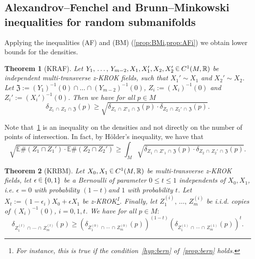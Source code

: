 \documentclass[AHL, Unicode, longabstracts, published]{cedram}
\newtheorem{mainthm}{Theorem}
\newcommand{\R}{\mathbb{R}}
\newcommand{\EE}{\mathbb{E}}
\newcommand{\fkZ}{\mathfrak{Z}}
\newcommand{\zkrok}{\emph{z-KROK}\xspace}
\newcommand*\randin{
\mathchoice {\raisebox{-.35ex}{$\displaystyle{^\subset}$}\mkern-11.5mu\raisebox{+.45ex}{$\displaystyle{_\subset}$}} {\mkern+1mu\raisebox{-.27ex}{$\textstyle{^\subset}$}\mkern-11.7mu\raisebox{+.45ex}{$\textstyle{_\subset}$}} {\raisebox{.35ex}{$\scriptstyle\subset$}\mkern-14mu\raisebox{-.15ex}{$\scriptstyle\subset$}} {\raisebox{.3ex}{$\scriptscriptstyle\subset$}\mkern-13.5mu\raisebox{-.10ex}{$\scriptscriptstyle\subset$}}}
\begin{document}
\subsection{Alexandrov--Fenchel and Brunn--Minkowski inequalities for random submanifolds}\label{sub:AFBM}

Applying the inequalities (AF) and (BM) (\cref{prop:BMi,prop:AFi}) we obtain lower bounds for the densities.

\begin{mainthm}[KRAF]\label{cor:KRAF}
Let $Y_1,\,\ldots,\,Y_{m-2},X_1,X_1',X_2,X_2'\,\randin\, C^1(M,\R)$ be independent multi-transverse {\zkrok} fields, such that $X_1'\sim X_1$ and $X_2'\sim X_2$. Let $\fkZ:=(Y_1)^{-1}(0)\cap\ldots\cap(Y_{m-2})^{-1}(0)$, $Z_i:=(X_i)^{-1}(0)$ and $Z_i':=(X_i')^{-1}(0)$. Then we have for all $p\in M$
\begin{equation*}
\delta_{Z_1\,\cap\,Z_2\,\cap\,\fkZ}(p)\geq \sqrt{\delta_{ Z_1\,\cap\,Z'_1\,\cap\,\fkZ}(p)\cdot \delta_{Z_2\,\cap\,Z_2'\,\cap\,\fkZ}(p)}.
\end{equation*}
\end{mainthm}

\begin{rema}
Note that~\cref{cor:KRAF} is an inequality on the densities and not directly on the number of points of intersection. In fact, by H\"older's inequality, we have that
\begin{equation*}
\sqrt{\EE\#\left(Z_1\cap Z_1'\right)\cdot\EE\#\left(Z_2\cap Z_2'\right)}\geq \int_M \sqrt{\delta_{ Z_1\,\cap\,Z'_1\,\cap\,\fkZ}(p)\cdot \delta_{Z_2\,\cap\,Z_2'\,\cap\,\fkZ}(p)}.
\end{equation*}
\end{rema}

\begin{mainthm}[KRBM]\label{cor:KRBM}
Let $X_0, X_1\,\randin\, C^1(M,\R)$ be {multi-transverse} {\zkrok} fields, let $\epsilon\,\randin\,\{0,1\}$ be a Bernoulli of parameter $0\leq t\leq 1$ independents of $X_0,X_1$, i.e. $\epsilon=0$ with probability $(1-t)$and $1$ with probability $t$. Let $X_t:=(1-\epsilon_i) X_0+\epsilon X_1$ be {\zkrok}\footnote{For instance, this is true if the condition~\eqref{hyp:bern} of~\cref{prop:bern} holds.}. Finally, let $Z_1^{(i)},\,\ldots,\,Z_m^{(i)}$ be i.i.d. copies of $(X_i)^{-1}(0)$, $i=0,1,t$. We have for all $p\in M:$
\begin{equation*}
\delta_{Z_1^{(t)}\,\cap\,\cdots\,\cap\,Z_m^{(t)}}(p)\geq \left(\delta_{Z_1^{(0)}\,\cap\,\cdots\,\cap\,Z_m^{(0)}}(p)\right)^{(1-t)}\left(\delta_{Z_1^{(1)}\,\cap\,\cdots\,\cap\,Z_m^{(1)}}(p)\right)^t.
\end{equation*}
\end{mainthm}
\end{document}
